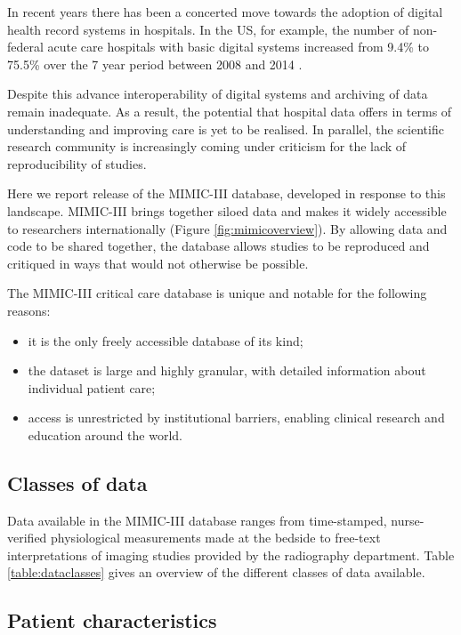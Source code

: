 \documentclass[english]{article}
\begin{document}
In recent years there has been a concerted move towards the adoption of digital health record systems in hospitals. In the US, for example, the number of non-federal acute care hospitals with basic digital systems increased from 9.4\% to 75.5\% over the 7 year period between 2008 and 2014 \cite{cite1}.

Despite this advance interoperability of digital systems and archiving of data remain inadequate. As a result, the potential that hospital data offers in terms of understanding and improving care is yet to be realised. In parallel, the scientific research community is increasingly coming under criticism for the lack of reproducibility of studies. 

Here we report release of the MIMIC-III database, developed in response to this landscape. MIMIC-III brings together siloed data and makes it widely accessible to researchers internationally (Figure  \ref{fig:mimicoverview}). By allowing data and code to be shared together, the database allows studies to be reproduced and critiqued in ways that would not otherwise be possible. 

The MIMIC-III critical care database is unique and notable for the following reasons: 
\begin{itemize}
  \item it is the only freely accessible database of its kind;
  \item the dataset is large and highly granular, with detailed information about individual patient care;
  \item access is unrestricted by institutional barriers, enabling clinical research and education around the world.
\end{itemize}

\subsection*{Classes of data}

Data available in the MIMIC-III database ranges from time-stamped, nurse-verified physiological measurements made at the bedside to free-text interpretations of imaging studies provided by the radiography department. Table \ref{table:dataclasses} gives an overview of the different classes of data available. 

\subsection*{Patient characteristics}
\end{document}
